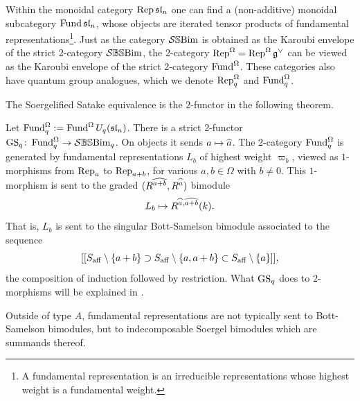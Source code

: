 {Within the monoidal category  $\operatorname{Rep} \mathfrak{sl}_n$ one can find a (non-additive) monoidal subcategory $\operatorname{Fund} \mathfrak{sl}_n$, whose objects are iterated tensor products of fundamental representations\footnote{A fundamental representation is an irreducible representations whose highest weight is a fundamental weight.}. Just as the category $\mathcal{S}\mathbb{S}\text{Bim}$ is obtained as the Karoubi envelope of the strict 2-category $\mathcal{S}\mathbb{BS}\text{Bim}$, the 2-category $\operatorname{Rep}^\Omega = \operatorname{Rep}^{\Omega} \mathfrak{g}^{\vee}$ can be viewed as the Karoubi envelope of the strict 2-category $\operatorname{Fund}^{\Omega}$. These categories also have quantum group analogues, which we denote $\operatorname{Rep}^\Omega_{q}$ and  $\operatorname{Fund}_{q}^{\Omega}$.

The Soergelified Satake equivalence is the $2$-functor in the following theorem.

\begin{theorem} \label{thm:main} Let $\operatorname{Fund}_q^{\Omega} := \operatorname{Fund}^{\Omega} U_q(\mathfrak{sl}_n)$. There is a strict 2-functor $\operatorname{GS}_{q} \colon \operatorname{Fund}^{\Omega}_q \to \mathcal{S}\mathbb{BS}\text{Bim}_{q}$. On objects it sends $a \mapsto \widehat{a}$. The $2$-category $\operatorname{Fund}_{q}^{\Omega}$ is generated by fundamental representations $L_b$ of highest weight $\varpi_b$, viewed as $1$-morphisms from $\operatorname{Rep}_a$ to $\operatorname{Rep}_{a+b}$, for various $a, b \in \Omega$ with $b \ne 0$. This $1$-morphism is sent to the graded $(R^{\widehat{a+b}},R^{\widehat{a}})$ bimodule 
\[ L_b \mapsto R^{\widehat{a}, \widehat{a+b}}(k).\]
That is, $L_b$ is sent to the singular Bott-Samelson bimodule associated to the sequence 
\[ [[S_{\operatorname{aff}} \setminus \{a+b\} \supset S_{\operatorname{aff}} \setminus \{a,a+b\} \subset S_{\operatorname{aff}} \setminus \{a\}]],\] the composition of induction followed by restriction.
What $\operatorname{GS}_q$ does to $2$-morphisms will be explained in . \end{theorem}

\begin{remark} Outside of type $A$, fundamental representations are not typically sent to Bott-Samelson bimodules, but to indecomposable Soergel bimodules which are summands thereof. \end{remark}

}
